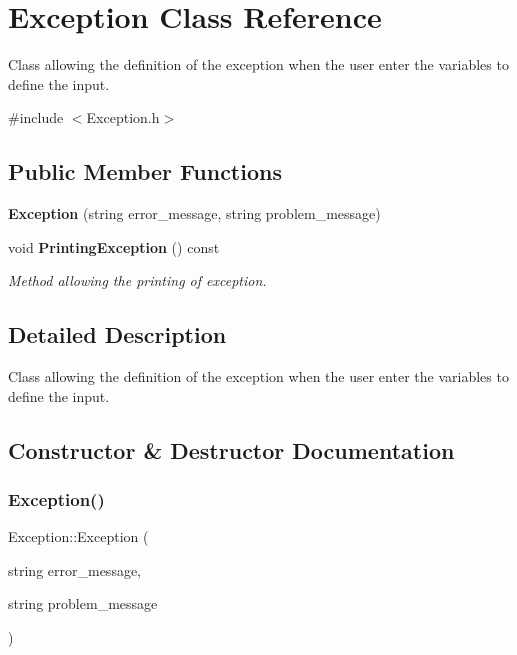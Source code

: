 \section{Exception Class Reference}
\label{class_exception}


Class allowing the definition of the exception when the user enter the variables to define the input.  




{\ttfamily \#include $<$Exception.\+h$>$}

\subsection*{Public Member Functions}
\begin{DoxyCompactItemize}
\item 
\textbf{ Exception} (string error\+\_\+message, string problem\+\_\+message)
\item 
\mbox{\label{class_exception_a9a98469926fba0d6b57f4aeb59ba864e}} 
void \textbf{ Printing\+Exception} () const
\begin{DoxyCompactList}\small\item\em Method allowing the printing of exception. \end{DoxyCompactList}\end{DoxyCompactItemize}


\subsection{Detailed Description}
Class allowing the definition of the exception when the user enter the variables to define the input. 

\subsection{Constructor \& Destructor Documentation}
\mbox{\label{class_exception_a5e9bccbea2b1cfa03884bf58728eb7cc}} 
\subsubsection{Exception()}
{\footnotesize\ttfamily Exception\+::\+Exception (\begin{DoxyParamCaption}\item[{string}]{error\+\_\+message,  }\item[{string}]{problem\+\_\+message }\end{DoxyParamCaption})}

